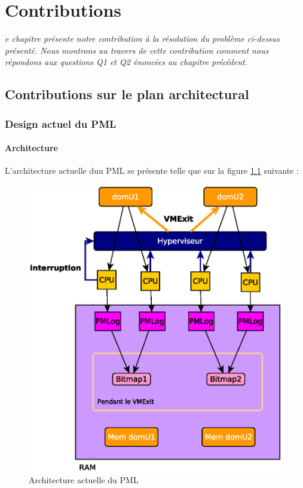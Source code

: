 \let\textcircled=\pgftextcircled
\chapter{Contributions}
\label{chap:contrib}

\textit{e chapitre présente notre contribution à la résolution du problème ci-dessus présenté. Nous montrons au travers de cette contribution comment nous répondons aux questions Q1 et Q2 énoncées au chapitre précédent.}

\minitoc

\newpage  
\section{Contributions sur le plan architectural}

\subsection{Design actuel du PML}

\subsubsection{Architecture}
L'architecture actuelle duu PML se présente telle que sur la figure \ref{fig:pml_actuel} suivante :
\begin{figure}[H]
    \centering
    \includegraphics[scale=.8]{chapters/3/fig3/PMLactual3}
    \caption{Architecture actuelle du PML}
    \label{fig:pml_actuel}
\end{figure}

